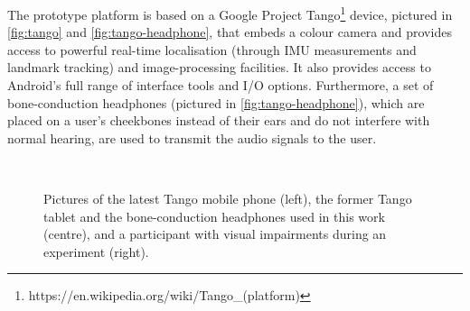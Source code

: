 \documentclass[]{interact}
\begin{document}
The prototype platform is based on a Google Project Tango\footnote{https://en.wikipedia.org/wiki/Tango\_(platform)} device, pictured in \cref{fig:tango} and \cref{fig:tango-headphone}, that embeds a colour camera and provides access to powerful real-time localisation (through IMU measurements and landmark tracking) and image-processing facilities. 
It also provides access to Android's full range of interface tools and I/O options. 
Furthermore, a set of bone-conduction headphones (pictured in \cref{fig:tango-headphone}), which are placed on a user's cheekbones instead of their ears and do not interfere with normal hearing, are used to transmit the audio signals to the user.

\begin{figure}[t]
  \centering
~
~
  \caption{Pictures of the latest Tango mobile phone (left), the former Tango tablet and the bone-conduction headphones used in this work (centre), and a participant with visual impairments during an experiment (right).}
\end{figure}
\end{document}
